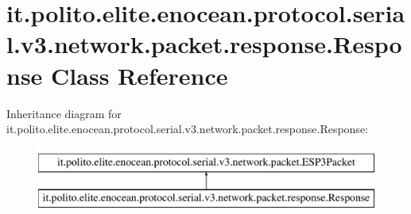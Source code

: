 \hypertarget{classit_1_1polito_1_1elite_1_1enocean_1_1protocol_1_1serial_1_1v3_1_1network_1_1packet_1_1response_1_1_response}{}\section{it.\+polito.\+elite.\+enocean.\+protocol.\+serial.\+v3.\+network.\+packet.\+response.\+Response Class Reference}
\label{classit_1_1polito_1_1elite_1_1enocean_1_1protocol_1_1serial_1_1v3_1_1network_1_1packet_1_1response_1_1_response}
Inheritance diagram for it.\+polito.\+elite.\+enocean.\+protocol.\+serial.\+v3.\+network.\+packet.\+response.\+Response\+:\begin{figure}[H]
\begin{center}
\leavevmode
\includegraphics[height=2.000000cm]{classit_1_1polito_1_1elite_1_1enocean_1_1protocol_1_1serial_1_1v3_1_1network_1_1packet_1_1response_1_1_response}
\end{center}
\end{figure}
